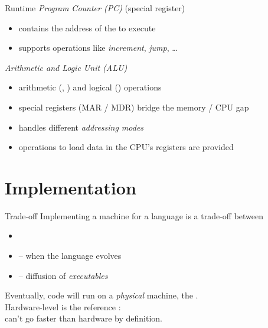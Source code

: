 \documentclass[10pt]{beamer}
\begin{document}
\begin{frame}{Runtime}
   \emph{Program Counter (PC)} (special register)
  \begin{itemize}
  \item contains the address of the  to execute
  \item supports operations like \emph{increment}, \emph{jump}, \ldots
  \end{itemize}
  \bigskip
   \emph{Arithmetic and Logic Unit (ALU)}
  \begin{itemize}
  \item arithmetic (, ) and logical ()
    operations
  \end{itemize}
  \bigskip
  \begin{itemize}
  \item special registers (MAR / MDR) bridge the memory / CPU gap
  \item handles different \emph{addressing modes}
  \item operations to load data in the CPU's registers are provided
  \end{itemize}
\end{frame}




\section{Implementation}



\begin{frame}{Trade-off}
  Implementing a machine for a language is a trade-off between
  \begin{itemize}
  \item {}
  \item {} -- when the language evolves
  \item {} -- diffusion of \emph{executables}
  \end{itemize}
  \bigskip
  Eventually, code will run on a \emph{physical} machine, the .
  \pause
  \\\bigskip
  Hardware-level is the reference :\\
  can't go faster than hardware by definition.
\end{frame}
\end{document}
